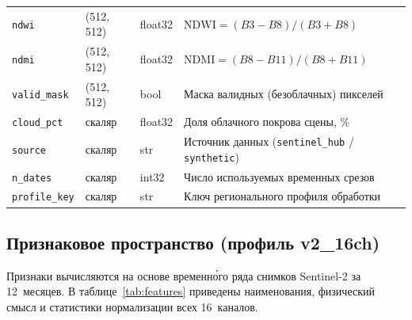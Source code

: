 \documentclass[14pt,a4paper]{extarticle}
\newcommand{\tbl}[1]{\texttt{#1}}  %
\begin{document}
\begin{table}[h!]
\begin{tabularx}{\textwidth}{L{30mm}L{26mm}L{14mm}X}
\tbl{ndwi}        & (512, 512)     & float32 & $\text{NDWI} = (B3 - B8)/(B3 + B8)$ \\
\tbl{ndmi}        & (512, 512)     & float32 & $\text{NDMI} = (B8 - B11)/(B8 + B11)$ \\
\tbl{valid\_mask} & (512, 512)     & bool    & Маска валидных (безоблачных) пикселей \\
\tbl{cloud\_pct}  & скаляр         & float32 & Доля облачного покрова сцены, \% \\
\tbl{source}      & скаляр         & str     & Источник данных (\tbl{sentinel\_hub} / \tbl{synthetic}) \\
\tbl{n\_dates}    & скаляр         & int32   & Число используемых временных срезов \\
\tbl{profile\_key}& скаляр         & str     & Ключ регионального профиля обработки \\
\bottomrule
\end{tabularx}
\end{table}

\subsection{Признаковое пространство (профиль v2\_16ch)}
\label{sec:features}

Признаки вычисляются на основе временн\'{о}го ряда снимков Sentinel-2
за 12~месяцев. В таблице~\ref{tab:features} приведены наименования,
физический смысл и статистики нормализации всех 16~каналов.
\end{document}
